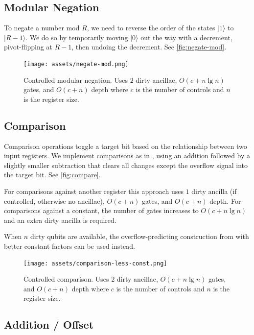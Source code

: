 \documentclass[twocolumn,longbibliography]{quantumarticle-customized}
\begin{document}
\subsection{Modular Negation}

To negate a number mod $R$, we need to reverse the order of the states $|1\rangle$ to $|R-1\rangle$.
We do so by temporarily moving $|0\rangle$ out the way with a decrement, pivot-flipping at $R-1$, then undoing the decrement.
See \autoref{fig:negate-mod}.

\begin{figure}
  \centering
  \texttt{[image: assets/negate-mod.png]}
  \caption{
    Controlled modular negation.
    Uses $2$ dirty ancillae, $O(c + n \lg n)$ gates, and $O(c + n)$ depth where $c$ is the number of controls and $n$ is the register size.
  }
  \label{fig:negate-mod}
\end{figure}


\subsection{Comparison}

Comparison operations toggle a target bit based on the relationship between two input registers.
We implement comparisons as in \cite{takahashi2005}, using an addition followed by a slightly smaller subtraction that clears all changes except the overflow signal into the target bit.
See \autoref{fig:compare}.

For comparisons against another register this approach uses $1$ dirty ancilla (if controlled, otherwise no ancillae), $O(c + n)$ gates, and $O(c + n)$ depth.
For comparisons against a constant, the number of gates increases to $O(c + n \lg n)$ and an extra dirty ancilla is required.

When $n$ dirty qubits are available, the overflow-predicting construction from \cite{haner2016} with better constant factors can be used instead.


\begin{figure}
  \centering
  \texttt{[image: assets/comparison-less-const.png]}
  \caption{
    Controlled comparison.
    Uses $2$ dirty ancillae, $O(c + n \lg n)$ gates, and $O(c + n)$ depth where $c$ is the number of controls and $n$ is the register size.
  }
  \label{fig:compare}
\end{figure}


\subsection{Addition / Offset}
\end{document}
